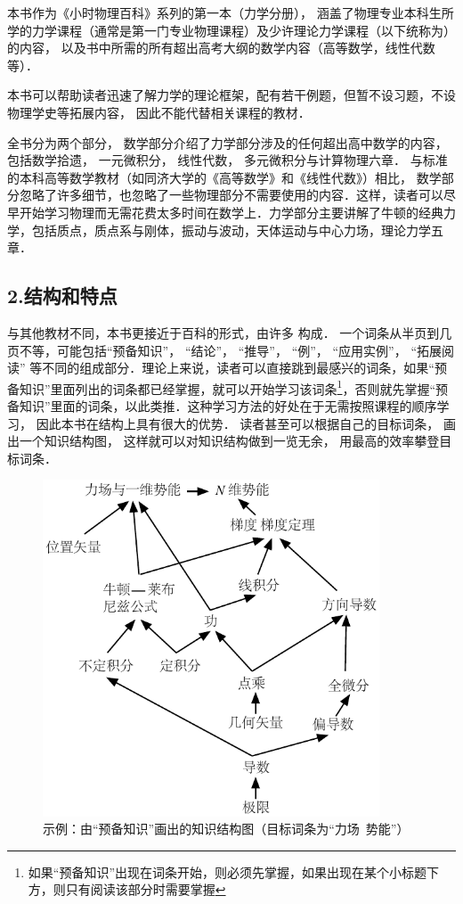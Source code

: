 本书作为《小时物理百科》系列的第一本（力学分册）， 涵盖了物理专业本科生所学的力学课程（通常是第一门专业物理课程）及少许理论力学课程（以下统称为）的内容， 以及书中所需的所有超出高考大纲的数学内容（高等数学，线性代数等）． 

本书可以帮助读者迅速了解力学的理论框架，配有若干例题，但暂不设习题，不设物理学史等拓展内容， 因此不能代替相关课程的教材．

全书分为两个部分， 数学部分介绍了力学部分涉及的任何超出高中数学的内容， 包括数学拾遗， 一元微积分， 线性代数， 多元微积分与计算物理六章． 与标准的本科高等数学教材（如同济大学的《高等数学》和《线性代数》）相比， 数学部分忽略了许多细节，也忽略了一些物理部分不需要使用的内容．这样，读者可以尽早开始学习物理而无需花费太多时间在数学上．力学部分主要讲解了牛顿的经典力学，包括质点，质点系与刚体，振动与波动，天体运动与中心力场，理论力学五章．

\subsection{2.结构和特点}
与其他教材不同，本书更接近于百科的形式，由许多 构成． 一个词条从半页到几页不等，可能包括“预备知识”， “结论”， “推导”， “例”， “应用实例”， “拓展阅读” 等不同的组成部分．理论上来说，读者可以直接跳到最感兴的词条，如果“预备知识”里面列出的词条都已经掌握，就可以开始学习该词条\footnote{如果“预备知识”出现在词条开始，则必须先掌握，如果出现在某个小标题下方，则只有阅读该部分时需要掌握}，否则就先掌握“预备知识”里面的词条，以此类推．这种学习方法的好处在于无需按照课程的顺序学习， 因此本书在结构上具有很大的优势．  读者甚至可以根据自己的目标词条， 画出一个知识结构图， 这样就可以对知识结构做到一览无余， 用最高的效率攀登目标词条． %

\begin{figure}[ht]
\centering
\includegraphics[width=10cm]{./figures/flowchart_example.pdf}
\caption{示例：由“预备知识”画出的知识结构图（目标词条为“力场\ 势能”）}
\end{figure}

